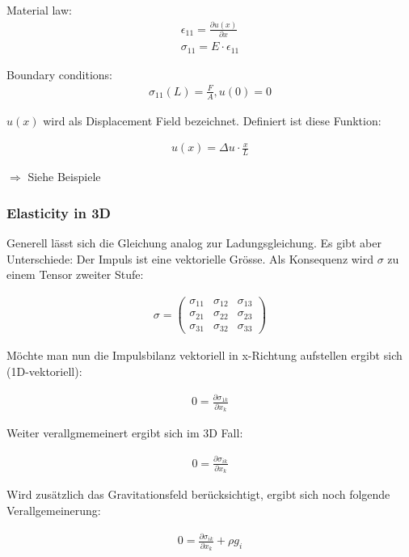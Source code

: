 \documentclass[a4paper, 10pt]{scrartcl}
\begin{document}
Material law:
\begin{align}
	\epsilon_{11}=\frac{\partial u(x)}{\partial x} \\
	\sigma_{11}= E \cdot \epsilon_{11}
\end{align}

Boundary conditions:
\begin{align}
	\sigma_{11}(L)=\frac{F}{A}, u(0)=0
\end{align}

$u(x)$ wird als \flqq Displacement Field\frqq{} bezeichnet. Definiert ist diese
Funktion:

\begin{align}
	u(x)=\Delta u \cdot \frac{x}{L}
\end{align}

$\Rightarrow$ Siehe Beispiele
\subsubsection{Elasticity in 3D}
Generell lässt sich die Gleichung analog zur Ladungsgleichung. Es gibt aber
Unterschiede: Der Impuls ist eine vektorielle Grösse. Als Konsequenz wird
$\sigma$ zu einem Tensor zweiter Stufe:

\begin{align}
	\sigma = \begin{pmatrix}
		\sigma_{11} & \sigma_{12} & \sigma_{13} \\
		\sigma_{21} & \sigma_{22} & \sigma_{23} \\
		\sigma_{31} & \sigma_{32} & \sigma_{33} 
	\end{pmatrix}
\end{align}

Möchte man nun die Impulsbilanz vektoriell in x-Richtung aufstellen ergibt sich
(1D-vektoriell):

\begin{align}
	0=\frac{\partial \sigma_{1k}}{\partial x_k}
\end{align}

Weiter verallgmemeinert ergibt sich im 3D Fall:

\begin{align}
	0=\frac{\partial \sigma_{ik}}{\partial x_k}
\end{align}

Wird zusätzlich das Gravitationsfeld berücksichtigt, ergibt sich noch folgende
Verallgemeinerung:

\begin{align}
	0=\frac{\partial \sigma_{ik}}{\partial x_k} + \rho g_i
\end{align}
\end{document}
